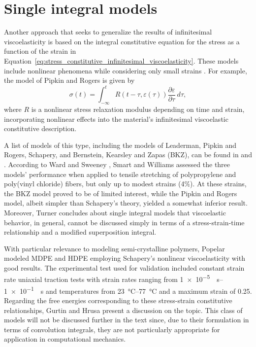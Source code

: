 \section{Single integral models}
Another approach that seeks to generalize the results of infinitesimal viscoelasticity is based on the integral constitutive equation for the stress as a function of the strain in Equation~\eqref{eq:stress_constitutive_infinitesimal_viscoelasticity}.
These models include nonlinear phenomena while considering only small strains \citep{wardIntroductionMechanicalProperties2004}.
For example, the model of Pipkin and Rogers is given by \citep{wardIntroductionMechanicalProperties2004}
\begin{equation}
	\sigma(t) = \int_{-\infty}^t R(t-\tau, \varepsilon(\tau))\frac{\partial \varepsilon}{\partial \tau}\ d\tau,
\end{equation}
where $R$ is a nonlinear stress relaxation modulus depending on time and strain, incorporating nonlinear effects into the material's infinitesimal viscoelastic constitutive description.

A list of models of this type, including the models of Leaderman, Pipkin and Rogers, Schapery, and Bernstein, Kearsley and Zapas (BKZ), can be found in \cite{wardIntroductionMechanicalProperties2004} and \cite{malkinRheologyConceptsMethods2017}.
According to Ward and Sweeney \citep{wardIntroductionMechanicalProperties2004}, Smart and Williams \citep{smartComparisonSingleintegralNonlinear1972} assessed the three models' performance when applied to tensile stretching of polypropylene and poly(vinyl chloride) fibers, but only up to modest strains (4\%).
At these strains, the BKZ model proved to be of limited interest, while the Pipkin and Rogers model, albeit simpler than Schapery's theory, yielded a somewhat inferior result.
Moreover, Turner \citep{turnerStrainResponsePlastics1966} concludes about single integral models that viscoelastic behavior, in general, cannot be discussed simply in terms of a stress-strain-time relationship and a modified superposition integral.

With particular relevance to modeling semi-crystalline polymers, Popelar \citep{popelarViscoelasticMaterialCharacterization1990} modeled MDPE and HDPE employing Schapery's nonlinear viscoelasticity with good results.
The experimental test used for validation included constant strain rate uniaxial traction tests with strain rates ranging from \SIrange{1e-5}{1e-1}{\per\second} and temperatures from \SIrange{23}{77}{\celsius} and a maximum strain of 0.25.
Regarding the free energies corresponding to these stress-strain constitutive relationships, Gurtin and Hrusa \citep{gurtinEnergiesNonlinearViscoelastic1988} present a discussion on the topic.
This class of models will not be discussed further in the text since, due to their formulation in terms of convolution integrals, they are not particularly appropriate for application in computational mechanics.

